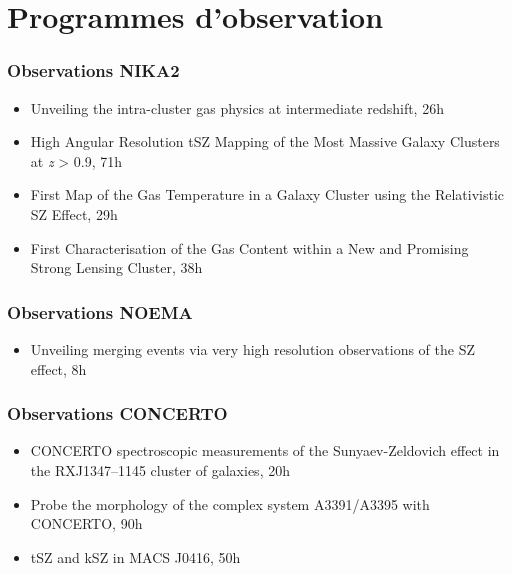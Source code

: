 \section{Programmes d'observation}

\subsubsection{Observations NIKA2}

\begin{itemize}[leftmargin=20pt]
    \setlength\itemsep{1pt}
    \item Unveiling the intra-cluster gas physics at intermediate redshift, 26h
    \item High Angular Resolution tSZ Mapping of the Most Massive Galaxy Clusters
        at {\it z} > 0.9, 71h
    \item First Map of the Gas Temperature in a Galaxy Cluster using the Relativistic
        SZ Effect, 29h
    \item First Characterisation of the Gas Content within a New and Promising Strong
        Lensing Cluster, 38h
\end{itemize}
\vspace{-3pt}

\subsubsection{Observations NOEMA}
\begin{itemize}[leftmargin=20pt]
    \item Unveiling merging events via very high resolution observations of the SZ effect, 8h
\end{itemize}
\vspace{-3pt}

\subsubsection{Observations CONCERTO}
\begin{itemize}[leftmargin=20pt]
    \item CONCERTO spectroscopic measurements of the Sunyaev-Zeldovich effect in the RXJ1347--1145 cluster of galaxies, 20h
    \item Probe the morphology of the complex system A3391/A3395 with CONCERTO, 90h
    \item tSZ and kSZ in MACS J0416, 50h
\end{itemize}
\vspace{-3pt}

